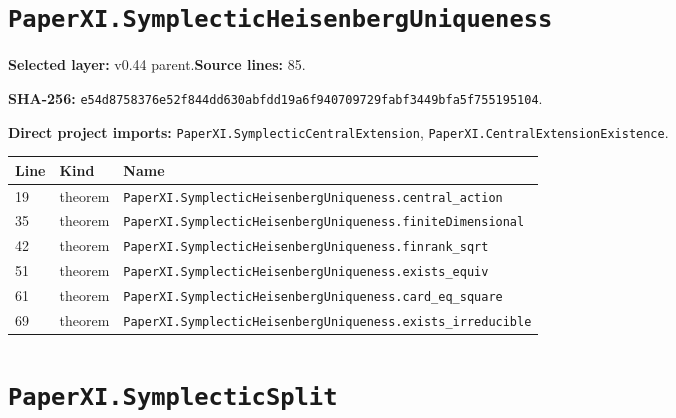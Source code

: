 \documentclass[10pt,oneside]{book}
\begin{document}
\section{\texorpdfstring{\nolinkurl{PaperXI.SymplecticHeisenbergUniqueness}}{PaperXI.SymplecticHeisenbergUniqueness}}\label{module:PaperXI.SymplecticHeisenbergUniqueness}

\textbf{Selected layer:} v0.44 parent.\quad\textbf{Source lines:} 85.\par\textbf{SHA-256:} {\scriptsize\nolinkurl{e54d8758376e52f844dd630abfdd19a6f940709729fabf3449bfa5f755195104}}.


\textbf{Direct project imports:} \nolinkurl{PaperXI.SymplecticCentralExtension}, \nolinkurl{PaperXI.CentralExtensionExistence}.

\begin{longtable}{@{}p{}p{}p{}@{}}\toprule Line&Kind&Name\\\midrule\endhead

19&theorem&\nolinkurl{PaperXI.SymplecticHeisenbergUniqueness.central_action}\\

35&theorem&\nolinkurl{PaperXI.SymplecticHeisenbergUniqueness.finiteDimensional}\\

42&theorem&\nolinkurl{PaperXI.SymplecticHeisenbergUniqueness.finrank_sqrt}\\

51&theorem&\nolinkurl{PaperXI.SymplecticHeisenbergUniqueness.exists_equiv}\\

61&theorem&\nolinkurl{PaperXI.SymplecticHeisenbergUniqueness.card_eq_square}\\

69&theorem&\nolinkurl{PaperXI.SymplecticHeisenbergUniqueness.exists_irreducible}\\

\bottomrule\end{longtable}

\section{\texorpdfstring{\nolinkurl{PaperXI.SymplecticSplit}}{PaperXI.SymplecticSplit}}\label{module:PaperXI.SymplecticSplit}
\end{document}
